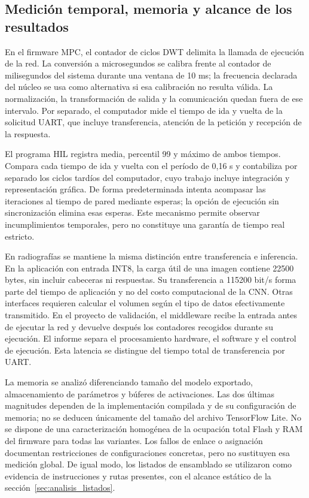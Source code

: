 \subsection{Medición temporal, memoria y alcance de los resultados}

En el firmware MPC, el contador de ciclos DWT delimita la llamada de ejecución de la red. La conversión a microsegundos se calibra frente al contador de milisegundos del sistema durante una ventana de 10 ms; la frecuencia declarada del núcleo se usa como alternativa si esa calibración no resulta válida. La normalización, la transformación de salida y la comunicación quedan fuera de ese intervalo. Por separado, el computador mide el tiempo de ida y vuelta de la solicitud UART, que incluye transferencia, atención de la petición y recepción de la respuesta.

El programa HIL registra media, percentil 99 y máximo de ambos tiempos. Compara cada tiempo de ida y vuelta con el período de 0,16 s y contabiliza por separado los ciclos tardíos del computador, cuyo trabajo incluye integración y representación gráfica. De forma predeterminada intenta acompasar las iteraciones al tiempo de pared mediante esperas; la opción de ejecución sin sincronización elimina esas esperas. Este mecanismo permite observar incumplimientos temporales, pero no constituye una garantía de tiempo real estricto.

En radiografías se mantiene la misma distinción entre transferencia e inferencia. En la aplicación con entrada INT8, la carga útil de una imagen contiene 22500 bytes, sin incluir cabeceras ni respuestas. Su transferencia a 115200 bit/s forma parte del tiempo de aplicación y no del costo computacional de la CNN. Otras interfaces requieren calcular el volumen según el tipo de datos efectivamente transmitido. En el proyecto de validación, el middleware recibe la entrada antes de ejecutar la red y devuelve después los contadores recogidos durante su ejecución. El informe separa el procesamiento hardware, el software y el control de ejecución. Esta latencia se distingue del tiempo total de transferencia por UART.

La memoria se analizó diferenciando tamaño del modelo exportado, almacenamiento de parámetros y búferes de activaciones. Las dos últimas magnitudes dependen de la implementación compilada y de su configuración de memoria; no se deducen únicamente del tamaño del archivo TensorFlow Lite. No se dispone de una caracterización homogénea de la ocupación total Flash y RAM del firmware para todas las variantes. Los fallos de enlace o asignación documentan restricciones de configuraciones concretas, pero no sustituyen esa medición global. De igual modo, los listados de ensamblado se utilizaron como evidencia de instrucciones y rutas presentes, con el alcance estático de la sección~\ref{sec:analisis_listados}.

